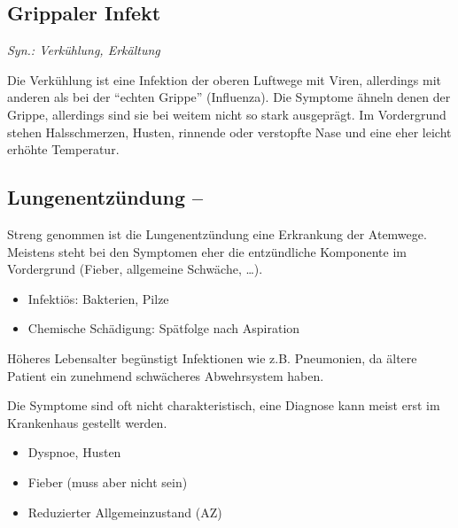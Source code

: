 \subsection{Grippaler Infekt}

\emph{Syn.: Verkühlung,
 Erkältung} 

{
Die Verkühlung ist eine Infektion der oberen Luftwege mit Viren,
allerdings mit anderen als bei der "`echten
Grippe"' (Influenza). Die Symptome ähneln denen der
Grippe, allerdings sind sie bei weitem nicht so stark ausgeprägt. Im
Vordergrund stehen Halsschmerzen, Husten, rinnende oder verstopfte Nase
und eine eher leicht erhöhte Temperatur. 
}{}{}{}{}



\subsection{Lungenentzündung -- }
\label{topic:pneumonie}

Streng genommen ist die Lungenentzündung eine Erkrankung der
Atemwege. Meistens steht bei den Symptomen eher die
entzündliche Komponente im Vordergrund (Fieber, allgemeine
Schwäche, \ldots).

{
\begin{itemize}
  \item Infektiös: Bakterien, Pilze
  \item Chemische Schädigung: Spätfolge nach
  Aspiration
\end{itemize}

Höheres Lebensalter begünstigt Infektionen wie z.B.
Pneumonien, da ältere Patient ein zunehmend schwächeres
Abwehrsystem haben.
}{}{}{}{}


{
Die Symptome sind oft nicht charakteristisch, eine Diagnose kann meist
erst im Krankenhaus gestellt werden. 

\begin{itemize}
  \item Dyspnoe, Husten
  \item Fieber (muss aber nicht sein)
  \item Reduzierter Allgemeinzustand (AZ)
\end{itemize}
}{

}{}{}{}





